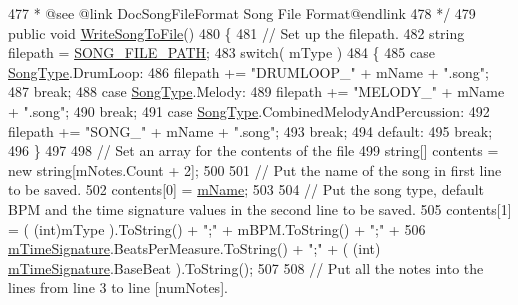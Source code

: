\begin{DoxyCodeInclude}
477 \textcolor{comment}{     * @see @link DocSongFileFormat Song File Format@endlink}
478 \textcolor{comment}{    */}
479     \textcolor{keyword}{public} \textcolor{keywordtype}{void} \hyperlink{group___song_pub_func_ga70b0f6021c3b0590c561a88e3d1e5c2f}{WriteSongToFile}()
480     \{
481         \textcolor{comment}{// Set up the filepath.}
482         \textcolor{keywordtype}{string} filepath = \hyperlink{group___song_const_ga95247572cf734f9e8b35973de4eeb1a4}{SONG\_FILE\_PATH};
483         \textcolor{keywordflow}{switch}( mType )
484         \{
485             \textcolor{keywordflow}{case} \hyperlink{group___song_enums_gae681a1f001333e39fc1cb4fea97bfe1b}{SongType}.DrumLoop:
486                 filepath += \textcolor{stringliteral}{"DRUMLOOP\_"} + mName + \textcolor{stringliteral}{".song"};
487                 \textcolor{keywordflow}{break};
488             \textcolor{keywordflow}{case} \hyperlink{group___song_enums_gae681a1f001333e39fc1cb4fea97bfe1b}{SongType}.Melody:
489                 filepath += \textcolor{stringliteral}{"MELODY\_"} + mName + \textcolor{stringliteral}{".song"};
490                 \textcolor{keywordflow}{break};
491             \textcolor{keywordflow}{case} \hyperlink{group___song_enums_gae681a1f001333e39fc1cb4fea97bfe1b}{SongType}.CombinedMelodyAndPercussion:
492                 filepath += \textcolor{stringliteral}{"SONG\_"} + mName + \textcolor{stringliteral}{".song"};
493                 \textcolor{keywordflow}{break};
494             \textcolor{keywordflow}{default}:
495                 \textcolor{keywordflow}{break};
496         \}
497 
498         \textcolor{comment}{// Set an array for the contents of the file}
499         \textcolor{keywordtype}{string}[] contents = \textcolor{keyword}{new} \textcolor{keywordtype}{string}[mNotes.Count + 2];
500 
501         \textcolor{comment}{// Put the name of the song in first line to be saved.}
502         contents[0] = \hyperlink{group___song_priv_var_ga6a5e6c1e4aa92939e2b5c1e3d9908df8}{mName};
503 
504         \textcolor{comment}{// Put the song type, default BPM and the time signature values in the second line to be saved.}
505         contents[1] = ( (int)mType ).ToString() + \textcolor{stringliteral}{";"} + mBPM.ToString() + \textcolor{stringliteral}{";"} +
506             \hyperlink{group___song_priv_var_ga2b2dcc0e83e49f7303b6a1371877b25e}{mTimeSignature}.BeatsPerMeasure.ToString() + \textcolor{stringliteral}{";"} + ( (int)
      \hyperlink{group___song_priv_var_ga2b2dcc0e83e49f7303b6a1371877b25e}{mTimeSignature}.BaseBeat ).ToString();
507 
508         \textcolor{comment}{// Put all the notes into the lines from line 3 to line [numNotes].  }

\end{DoxyCodeInclude}
